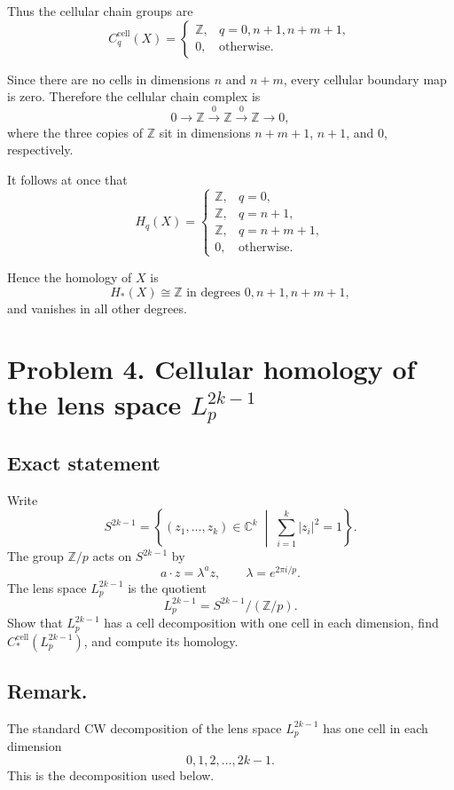 \documentclass[12pt,a4paper]{article}
\theoremstyle{notespace}
\begin{document}
Thus the cellular chain groups are
\[
C_q^{\mathrm{cell}}(X)=
\begin{cases}
	\mathbb Z, & q=0,n+1,n+m+1,\\[4pt]
	0, & \text{otherwise}.
\end{cases}
\]

Since there are no cells in dimensions \(n\) and \(n+m\), every cellular boundary map is zero. Therefore the cellular chain complex is
\[
0 \longrightarrow \mathbb Z
\overset{0}{\longrightarrow}
\mathbb Z
\overset{0}{\longrightarrow}
\mathbb Z
\longrightarrow 0,
\]
where the three copies of \(\mathbb Z\) sit in dimensions \(n+m+1\), \(n+1\), and \(0\), respectively.

It follows at once that
\[
H_q(X)=
\begin{cases}
	\mathbb Z, & q=0,\\[4pt]
	\mathbb Z, & q=n+1,\\[4pt]
	\mathbb Z, & q=n+m+1,\\[4pt]
	0, & \text{otherwise}.
\end{cases}
\]

Hence the homology of \(X\) is
\[
H_*(X)\cong \mathbb Z \text{ in degrees }0,n+1,n+m+1,
\]
and vanishes in all other degrees.

\bigskip

\section{Problem 4. Cellular homology of the lens space \texorpdfstring{$L_p^{2k-1}$}{L\_p\string^{2k-1}}}

\subsection*{Exact statement}
Write
\[
S^{2k-1}=\left\{(z_1,\dots,z_k)\in \mathbb C^k \;\middle|\; \sum_{i=1}^k |z_i|^2=1\right\}.
\]
The group \(\mathbb Z/p\) acts on \(S^{2k-1}\) by
\[
a\cdot z=\lambda^a z,\qquad \lambda=e^{2\pi i/p}.
\]
The lens space \(L_p^{2k-1}\) is the quotient
\[
L_p^{2k-1}=S^{2k-1}/(\mathbb Z/p).
\]
Show that \(L_p^{2k-1}\) has a cell decomposition with one cell in each dimension, find \(C_*^{\mathrm{cell}}(L_p^{2k-1})\), and compute its homology.

\subsection*{Remark.}
The standard CW decomposition of the lens space \(L_p^{2k-1}\) has one cell in each dimension
\[
0,1,2,\dots,2k-1.
\]
This is the decomposition used below.
\end{document}

